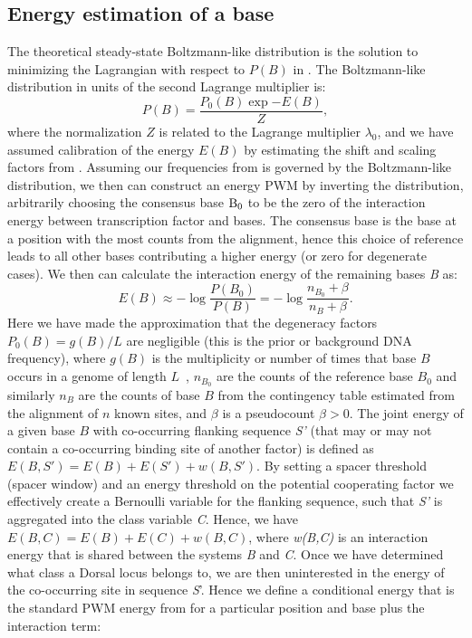 \subsection{Energy estimation of a base}
The theoretical steady-state Boltzmann-like distribution is the solution to minimizing the Lagrangian with respect to $P(B)$ in .  The Boltzmann-like distribution in units of the second Lagrange multiplier is:
\begin{equation}\label{bz}
P(B)=\frac{P_0(B)\exp{-E(B)}}{Z},
\end{equation}
where the normalization $Z$ is related to the Lagrange multiplier $\lambda_0$, and we have assumed calibration of the energy $E(B)$ by estimating the shift and scaling factors from .  
Assuming our frequencies from  is governed by the Boltzmann-like distribution, 
we then can construct an energy PWM by inverting the distribution, arbitrarily choosing the consensus base $\rm{B_0}$ to be the zero of the interaction energy between transcription factor and bases.  The consensus base is the base at a position with the most counts from the alignment, hence this choice of reference leads to all other bases contributing a higher energy (or zero for degenerate cases).  We then can calculate the interaction energy of the remaining bases \textit{B} as:
\begin{equation}\label{epwm2}
E(B) \approx -\log{\frac{P(B_0)}{P(B)}} =- \log{ \frac{n_{B_0}+\beta}{n_B+\beta} }.
\end{equation}
Here we have made the approximation that the degeneracy factors $P_0(B) = g(B)/L$ are negligible (this is the prior or background DNA frequency), where $g(B)$ is the multiplicity or number of times that base $B$ occurs in a genome of length $L$~\cite{pmid2082934}, $n_{B_0}$ are the counts of the reference base $B_0$ and similarly $n_B$ are the counts of base $B$ from the contingency table estimated from the alignment of $n$ known sites, and $\beta$ is a pseudocount $\beta>0$.  The joint energy of a given base $B$ with co-occurring flanking sequence \textit{S'} (that may or may not contain a co-occurring binding site of another factor) is defined as $E(B,S') = E(B) +E(S') + w(B,S')$.  By setting a spacer threshold (spacer window) and an energy threshold on the potential cooperating factor we effectively create a Bernoulli variable for the flanking sequence, such that \textit{S'} is aggregated into the class variable \textit{C}.  Hence, we have $E(B,C) = E(B) +E(C) + w(B,C)$, where \textit{w(B,C)} is an interaction energy that is shared between the systems \textit{B} and \textit{C}.  Once we have determined what class a Dorsal locus belongs to, we are then uninterested in the energy of the co-occurring site in sequence \textit{S}'.  Hence we define a conditional energy that is the standard PWM energy from  for a particular position and base plus the interaction term:
